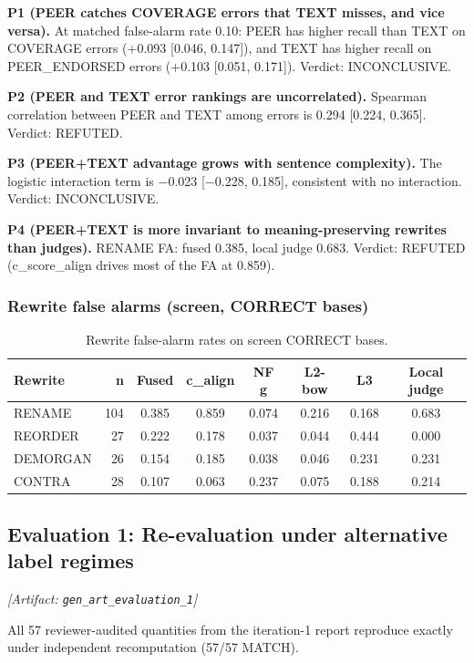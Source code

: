 \documentclass[11pt,letterpaper]{article}
\begin{document}
\textbf{P1 (PEER catches COVERAGE errors that TEXT misses, and vice versa).} At matched false-alarm rate 0.10: PEER has higher recall than TEXT on COVERAGE errors (+0.093 [0.046, 0.147]), and TEXT has higher recall on PEER\_ENDORSED errors (+0.103 [0.051, 0.171]). Verdict: INCONCLUSIVE.

\textbf{P2 (PEER and TEXT error rankings are uncorrelated).} Spearman correlation between PEER and TEXT among errors is 0.294 [0.224, 0.365]. Verdict: REFUTED.

\textbf{P3 (PEER+TEXT advantage grows with sentence complexity).} The logistic interaction term is $-$0.023 [$-$0.228, 0.185], consistent with no interaction. Verdict: INCONCLUSIVE.

\textbf{P4 (PEER+TEXT is more invariant to meaning-preserving rewrites than judges).} RENAME FA: fused 0.385, local judge 0.683. Verdict: REFUTED (c\_score\_align drives most of the FA at 0.859).

\subsubsection{Rewrite false alarms (screen, CORRECT bases)}

\begin{table}[!htbp]
\centering
\caption{Rewrite false-alarm rates on screen CORRECT bases.}
\label{tab:rewrite_fa_screen}
\begin{tabular}{lrcccccc}
\toprule
Rewrite & n & Fused & c\_align & NF g & L2-bow & L3 & Local judge \\
\midrule
RENAME & 104 & 0.385 & 0.859 & 0.074 & 0.216 & 0.168 & 0.683 \\
REORDER & 27 & 0.222 & 0.178 & 0.037 & 0.044 & 0.444 & 0.000 \\
DEMORGAN & 26 & 0.154 & 0.185 & 0.038 & 0.046 & 0.231 & 0.231 \\
CONTRA & 28 & 0.107 & 0.063 & 0.237 & 0.075 & 0.188 & 0.214 \\
\bottomrule
\end{tabular}
\end{table}

\subsection{Evaluation 1: Re-evaluation under alternative label regimes}
\label{sec:eval1}
\noindent\textit{[Artifact: \texttt{gen\_art\_evaluation\_1}]}

All 57 reviewer-audited quantities from the iteration-1 report reproduce exactly under independent recomputation (57/57 MATCH).
\end{document}
